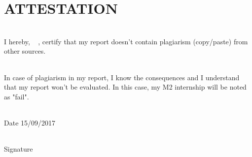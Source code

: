 \chapter*{ATTESTATION}



\vfill


\noindent\hrulefill

~\\


I hereby,  \FirstName~  \LastName, certify that my report doesn't contain plagiarism (copy/paste) from other sources.

~\\

In case of plagiarism in my report, I know the consequences and I understand that my report won't be evaluated. In this case, my M2 internship will be noted as "fail".


~\\

 Date 15/09/2017 

~\\
 
 Signature
 \FirstName~  \LastName
 

~\\
~\\
~\\
~\\
~\\

\noindent\hrulefill


\vfill


\vfill



%
%
%
%
%
%
%
%
%
% 
% 
%
% 
%
%
%
%
%
